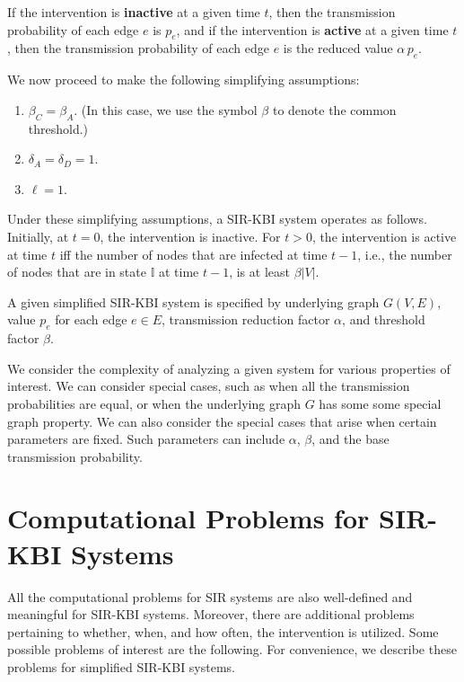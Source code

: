 \documentclass[11pt]{article}
\newcommand{\istate}{\mbox{$\mathbb{I}$}}
\begin{document}
If the intervention is {\bf inactive} at a given time $t$,
then  the transmission probability of each edge $e$ is $p_e$,
and if the intervention is {\bf active} at a given time $t$,
then  the transmission probability of each edge $e$ is the reduced value $\alpha \, p_e$.


We now proceed to make the following simplifying assumptions:
\begin{enumerate}
\item
$\beta_C = \beta_A$. (In this case, we use the symbol $\beta$ to denote the common threshold.)
\item
$\delta_A = \delta_D = 1$.
\item
$\ell = 1$.
\end{enumerate}

Under these simplifying assumptions, a SIR-KBI system operates as follows.
Initially, at $t = 0$, the intervention is inactive.
For $t > 0$, the intervention is active at time $t$
iff the number of nodes that are infected at time $t-1$,
i.e., the number of nodes that are in state $\istate$ at time $t-1$,
 is at least $\beta |V|$.

A given simplified SIR-KBI system is specified by underlying graph $G(V,E)$, 
value $p_e$ for each edge $e \in E$,
transmission reduction factor $\alpha$, and threshold factor $\beta$.



We consider the complexity of analyzing a given system for various properties of interest.
We can consider special cases, such as when all the transmission probabilities are equal,
or when the underlying graph $G$ has some some special graph property.
We can also consider the special cases that arise when certain parameters are fixed.
Such parameters can include $\alpha$, $\beta$, and the base transmission probability.

\section{Computational Problems for SIR-KBI Systems}
\label{sec:computational_problems}

All the computational problems for SIR systems 
are also well-defined and meaningful for SIR-KBI systems.
Moreover, there are additional problems pertaining to  whether, when, and how often,
the intervention is utilized. Some possible problems of interest are the following.
For convenience, we describe these problems for simplified SIR-KBI systems.

\bigskip
\end{document}
